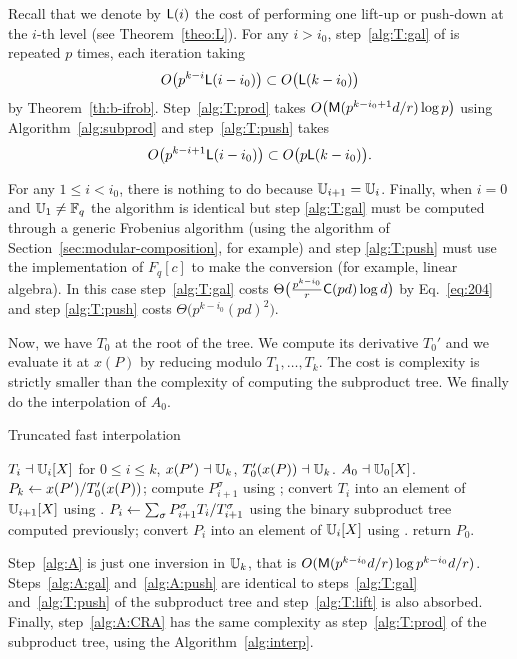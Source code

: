 Recall that we denote by $\mathsf{L}(i)$ the cost of performing one lift-up
or push-down at the $i$-th level (see Theorem~\ref{theo:L}). For any
$i>i_0$, step~\ref{alg:T:gal} of is repeated $p$ times, each iteration
taking 
\[O\bigl(p^{k-i}\mathsf{L}(i-i_0)\bigr) \subset O\bigl(\mathsf{L}(k-i_0)\bigr)\]
by Theorem~\ref{th:b-ifrob}.  Step~\ref{alg:T:prod} takes
$O\bigl(\mathsf{M}(p^{k-i_0+1}d/r)\log p\bigr)$ using
Algorithm~\ref{alg:subprod} and step~\ref{alg:T:push} takes
\[O\bigl(p^{k-i+1}\mathsf{L}(i-i_0)\bigr) \subset
O\bigl(p\mathsf{L}(k-i_0)\bigr)\text{.}\]

For any $1\le i<i_0$, there is nothing to do because
$\mathbb{U}_{i+1}=\mathbb{U}_i$. Finally, when $i=0$ and $\mathbb{U}_1\ne\mathbb{F}_q$ the algorithm
is identical but step \ref{alg:T:gal} must be computed through a
generic Frobenius algorithm (using the algorithm of
Section~\ref{sec:modular-composition}, for example) and step
\ref{alg:T:push} must use the implementation of $F_q[c]$ to make the
conversion (for example, linear algebra). In this case
step~\ref{alg:T:gal} costs
$\Theta\bigl(\frac{p^{k-i_0}}{r}\mathsf{C}(pd)\log d \bigr)$
by Eq.~\eqref{eq:204} and step \ref{alg:T:push} costs
$\Theta\bigl(p^{k-i_0}(pd)^2\bigr)$.

Now, we have $T_0$ at the root of the tree. We compute its derivative
$T_0'$ and we evaluate it at $x(P)$ by reducing modulo
$T_1,\ldots,T_k$. The cost is complexity is strictly smaller than the
complexity of computing the subproduct tree.  We finally do the
interpolation of $A_0$.

\begin{algorithm}
  \caption{Truncated fast interpolation}
  \begin{algorithmic}[1]
    \REQUIRE $T_i\dashv\mathbb{U}_i[X]$ for $0\le i\le k$, $x(P')\dashv\mathbb{U}_k$, $T_0'(x(P))\dashv\mathbb{U}_k$.
    \ENSURE $A_0\dashv\mathbb{U}_0[X]$.
    \STATE\label{alg:A}  $P_k \leftarrow x(P')/T_0'(x(P))$;
    \STATE\label{alg:A:gal} compute $P_{i+1}^\sigma$ using ;
    \ENDFOR
    \STATE\label{alg:T:lift} convert $T_i$ into an element of $\mathbb{U}_{i+1}[X]$ using .
    \STATE\label{alg:A:CRA} $P_i\leftarrow \sum_{\sigma}P_{i+1}^\sigma T_i/T_{i+1}^\sigma$ using the binary subproduct tree computed previously;
    \STATE\label{alg:A:push} convert  $P_i$ into an element of
    $\mathbb{U}_i[X]$ using .
    \ENDFOR return $P_0$.
  \end{algorithmic}
\end{algorithm}

Step~\ref{alg:A} is just one inversion in $\mathbb{U}_k$, that is
$O(\mathsf{M}(p^{k-i_0}d/r)\log p^{k-i_0}d/r)$. Steps~\ref{alg:A:gal}
and~\ref{alg:A:push} are identical to steps~\ref{alg:T:gal}
and~\ref{alg:T:push} of the subproduct tree and step~\ref{alg:T:lift}
is also absorbed. Finally, step~\ref{alg:A:CRA} has the same
complexity as step~\ref{alg:T:prod} of the subproduct tree, using the
Algorithm~\ref{alg:interp}.

